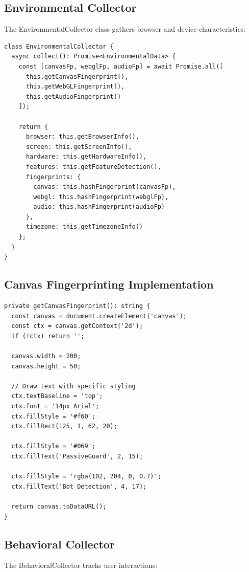 \subsection{Environmental Collector}

The EnvironmentalCollector class gathers browser and device characteristics:

\begin{verbatim}
class EnvironmentalCollector {
  async collect(): Promise<EnvironmentalData> {
    const [canvasFp, webglFp, audioFp] = await Promise.all([
      this.getCanvasFingerprint(),
      this.getWebGLFingerprint(),
      this.getAudioFingerprint()
    ]);
    
    return {
      browser: this.getBrowserInfo(),
      screen: this.getScreenInfo(),
      hardware: this.getHardwareInfo(),
      features: this.getFeatureDetection(),
      fingerprints: {
        canvas: this.hashFingerprint(canvasFp),
        webgl: this.hashFingerprint(webglFp),
        audio: this.hashFingerprint(audioFp)
      },
      timezone: this.getTimezoneInfo()
    };
  }
}
\end{verbatim}

\subsection{Canvas Fingerprinting Implementation}

\begin{verbatim}
private getCanvasFingerprint(): string {
  const canvas = document.createElement('canvas');
  const ctx = canvas.getContext('2d');
  if (!ctx) return '';

  canvas.width = 200;
  canvas.height = 50;

  // Draw text with specific styling
  ctx.textBaseline = 'top';
  ctx.font = '14px Arial';
  ctx.fillStyle = '#f60';
  ctx.fillRect(125, 1, 62, 20);

  ctx.fillStyle = '#069';
  ctx.fillText('PassiveGuard', 2, 15);
  
  ctx.fillStyle = 'rgba(102, 204, 0, 0.7)';
  ctx.fillText('Bot Detection', 4, 17);

  return canvas.toDataURL();
}
\end{verbatim}

\subsection{Behavioral Collector}

The BehavioralCollector tracks user interactions:


